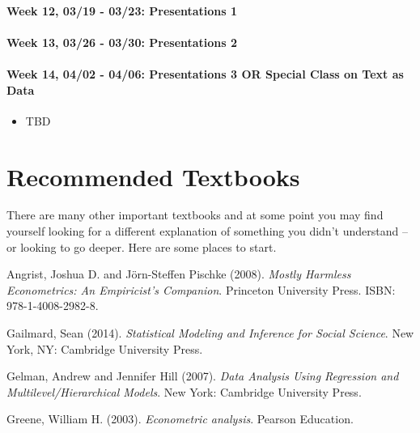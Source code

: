 \documentclass[11pt,]{article}
\providecommand{\tightlist}{%
  \setlength{\itemsep}{0pt}\setlength{\parskip}{0pt}}
\begin{document}
\paragraph{Week 12, 03/19 - 03/23: Presentations
1}\label{week-12-0319---0323-presentations-1}

\paragraph{Week 13, 03/26 - 03/30: Presentations
2}\label{week-13-0326---0330-presentations-2}

\paragraph{Week 14, 04/02 - 04/06: Presentations 3 OR Special Class on
Text as
Data}\label{week-14-0402---0406-presentations-3-or-special-class-on-text-as-data}

\begin{itemize}
\tightlist
\item
  TBD
\end{itemize}

\section{Recommended Textbooks}\label{recommended-textbooks}

There are many other important textbooks and at some point you may find
yourself looking for a different explanation of something you didn't
understand -- or looking to go deeper. Here are some places to start.

 Angrist, Joshua D. and Jörn-Steffen Pischke (2008).
\emph{Mostly Harmless Econometrics: An Empiricist's Companion}.
Princeton University Press. ISBN: 978-1-4008-2982-8.

 Gailmard, Sean (2014).
\emph{Statistical Modeling and Inference for Social Science}. New York,
NY: Cambridge University Press.

 Gelman, Andrew and Jennifer Hill (2007).
\emph{Data Analysis Using Regression and
Multilevel/Hierarchical Models}. New York: Cambridge University Press.

 Greene, William H. (2003).
\emph{Econometric analysis}. Pearson Education.
\end{document}
